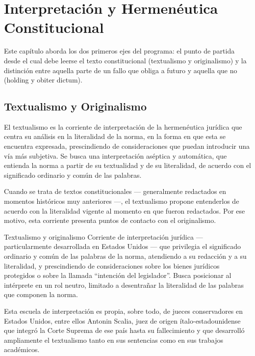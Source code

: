 \documentclass[12pt,oneside]{book}
\begin{document}
\chapter{Interpretación y Hermenéutica Constitucional}

Este capítulo aborda los dos primeros ejes del programa: el punto de partida desde el cual debe leerse el texto constitucional (textualismo y originalismo) y la distinción entre aquella parte de un fallo que obliga a futuro y aquella que no (holding y obiter dictum).

\section{Textualismo y Originalismo}

El textualismo es la corriente de interpretación de la hermenéutica jurídica que centra su análisis en la literalidad de la norma, en la forma en que esta se encuentra expresada, prescindiendo de consideraciones que puedan introducir una vía más subjetiva. Se busca una interpretación aséptica y automática, que entienda la norma a partir de su textualidad y de su literalidad, de acuerdo con el significado ordinario y común de las palabras.

Cuando se trata de textos constitucionales --- generalmente redactados en momentos históricos muy anteriores ---, el textualismo propone entenderlos de acuerdo con la literalidad vigente al momento en que fueron redactados. Por ese motivo, esta corriente presenta puntos de contacto con el originalismo.

\begin{definition}{Textualismo y originalismo}
Corriente de interpretación jurídica --- particularmente desarrollada en Estados Unidos --- que privilegia el significado ordinario y común de las palabras de la norma, atendiendo a su redacción y a su literalidad, y prescindiendo de consideraciones sobre los bienes jurídicos protegidos o sobre la llamada ``intención del legislador''. Busca posicionar al intérprete en un rol neutro, limitado a desentrañar la literalidad de las palabras que componen la norma.
\end{definition}

Esta escuela de interpretación es propia, sobre todo, de jueces conservadores en Estados Unidos, entre ellos Antonin Scalia, juez de origen ítalo-estadounidense que integró la Corte Suprema de ese país hasta su fallecimiento y que desarrolló ampliamente el textualismo tanto en sus sentencias como en sus trabajos académicos.
\end{document}
